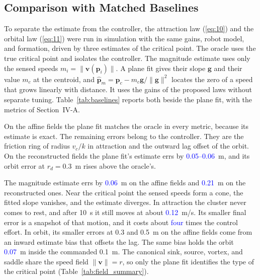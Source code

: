 \documentclass[lettersize,journal]{IEEEtran}
\newcommand{\rev}[1]{\textcolor{blue}{#1}}           %
\begin{document}
\subsection{Comparison with Matched Baselines}

To separate the estimate from the controller, the attraction law (\ref{eq:10}) and the orbital law (\ref{eq:11}) were run in simulation with the same gains, robot model, and formation, driven by three estimates of the critical point. The oracle uses the true critical point and isolates the controller. The magnitude estimate uses only the sensed speeds $m_i = \|\mathbf{v}(\mathbf{p}_i)\|$. A plane fit gives their slope $\mathbf{g}$ and their value $m_c$ at the centroid, and $\hat{\mathbf{p}}_m = \mathbf{p}_c - m_c\mathbf{g}/\|\mathbf{g}\|^2$ locates the zero of a speed that grows linearly with distance. It uses the gains of the proposed laws without separate tuning. Table~\ref{tab:baselines} reports both beside the plane fit, with the metrics of Section~IV-A.

On the affine fields the plane fit matches the oracle in every metric, because its estimate is exact. The remaining errors belong to the controller. They are the friction ring of radius $v_c/k$ in attraction and the outward lag offset of the orbit. On the reconstructed fields the plane fit's estimate errs by \rev{0.05--0.06}~m, and its orbit error at $r_d = 0.3$~m rises above the oracle's. %

The magnitude estimate errs by \rev{0.06}~m on the affine fields and \rev{0.21}~m on the reconstructed ones. Near the critical point the sensed speeds form a cone, the fitted slope vanishes, and the estimate diverges. In attraction the cluster never comes to rest, and after 10~s it still moves at about \rev{0.12}~m/s. Its smaller final error is a snapshot of that motion, and it costs about \rev{four} times the control effort. In orbit, its smaller errors at 0.3 and 0.5~m on the affine fields come from an inward estimate bias that offsets the lag. The same bias holds the orbit \rev{0.07}~m inside the commanded 0.1~m. The canonical sink, source, vortex, and saddle share the speed field $\|\mathbf{v}\| = r$, so only the plane fit identifies the type of the critical point (Table~\ref{tab:field_summary}). %
\end{document}
